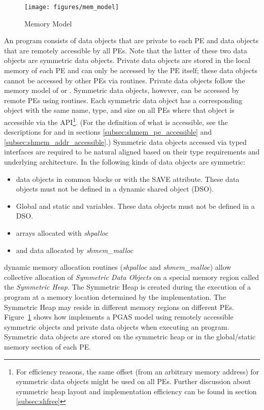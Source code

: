 \begin{figure}[h]
\texttt{[image: figures/mem\_model]}      
\caption{\openshmem Memory Model}
\label{fig:mem_model}                                               
\end{figure}      
%
An \openshmem program consists of data objects that are private to each \ac{PE}
and data  objects that are remotely accessible by all \acp{PE}. Note that the latter 
of these two data objects are symmetric data objects. Private data
objects are stored in the local memory of each \ac{PE} and can only be accessed
by the \ac{PE} itself; these data objects cannot be accessed by other \acp{PE}
via \openshmem routines. Private data objects follow the memory model of
\Cstd or \Fortran. Symmetric data objects, however, can be accessed by
remote \acp{PE} using \openshmem routines. Each symmetric data object has a
corresponding object with the same name, type, and size on all PEs where that object is
accessible via the \openshmem \ac{API}\footnote{For efficiency reasons,
the same offset (from an arbitrary memory address) for symmetric data
objects might be used on all \acp{PE}. Further discussion about symmetric heap
layout and implementation efficiency can be found in section
\ref{subsec:shfree}}.  (For the definition of what is accessible, see the
descriptions for  and 
in sections \ref{subsec:shmem_pe_accessible} and
\ref{subsec:shmem_addr_accessible}.) Symmetric data objects accessed via typed
\openshmem interfaces are required to be natural aligned based on their type
requirements and underlying architecture.  In \openshmem the following kinds of
data objects are symmetric:
%
\begin{itemize}
  \item \Fortran data objects in common blocks or with the  SAVE  attribute.
      These data objects must not be defined in a dynamic shared object (DSO).
  \item Global and static \Cstd and \Cpp variables. These data objects must
      not  be defined in a DSO.
  \item \Fortran arrays allocated with \textit{shpalloc} 
  \item \Cstd and \Cpp data allocated by \textit{shmem\_malloc}
\end{itemize}       

\openshmem dynamic memory allocation routines (\textit{shpalloc} and
\textit{shmem\_malloc}) allow collective allocation of \emph{Symmetric Data
Objects} on a special memory region called the \emph{Symmetric Heap}. The
Symmetric Heap is created during the execution of a program at a memory location
determined by the implementation. The Symmetric Heap may reside in different
memory regions on different \acp{PE}. Figure~\ref{fig:mem_model} shows how
\openshmem implements a \ac{PGAS} model using remotely accessible symmetric
objects and private data objects when executing an \openshmem program.
Symmetric data objects are stored on the symmetric heap or in the global/static
memory section of each \ac{PE}. 

